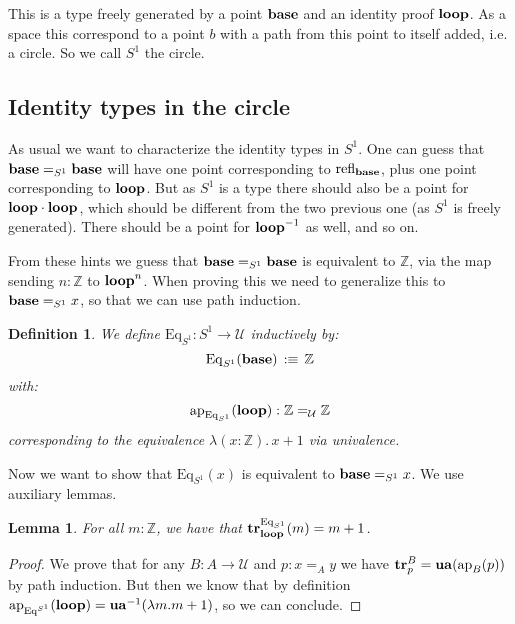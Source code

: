 \documentclass{article}
\newcommand{\sse}[1]{\medbreak \subsection{#1}}
\newcommand{\U}{{\mathcal U}}
\renewcommand{\r}{\rightarrow}
\newcommand{\Gl}{\lambda}
\newcommand{\ap}{\mathrm{ap}}
\newcommand{\refl}{\mathrm{refl}}
\newcommand{\tr}{\mathrm{\bf tr}}
\newcommand{\ua}{\mathrm{\bf ua}}
\newcommand{\base}{\mathrm{\bf base}}
\renewcommand{\loop}{\mathrm{\bf loop}}
\newcommand{\Eq}{\mathrm{Eq}}
\newtheorem{lemma}{Lemma}
\newtheorem{definition}{Definition}
\begin{document}
This is a type freely generated by a point $\base$ and an identity proof $\loop$. As a space this correspond to a point $b$ with a path from this point to itself added, i.e. a circle. So we call $S^1$ the circle. 

\sse{Identity types in the circle}

As usual we want to characterize the identity types in $S^1$. One can guess that $\base=_{S^1}\base$ will have one point corresponding to $\refl_\base$, plus one point corresponding to $\loop$. But as $S^1$ is a type there should also be a point for $\loop\cdot\loop$, which should be different from the two previous one (as $S^1$ is freely generated). There should be a point for $\loop^{-1}$ as well, and so on.

From these hints we guess that $\base=_{S^1}\base$ is equivalent to $\mathbb{Z}$, via the map sending $n:\mathbb{Z}$ to $\loop^n$. When proving this we need to generalize this to $\base=_{S^1}x$, so that we can use path induction.

\begin{definition}
We define $\Eq_{S^1} : S^1 \r \U$ inductively by:
\[\Eq_{S^1}(\base) \, :\equiv\, \mathbb{Z}\]
with: 
\[\ap_{\Eq_{S^1}}(\loop) : \mathbb{Z}=_\U\mathbb{Z}\] 
corresponding to the equivalence $\Gl(x:\mathbb{Z}).\, x+1$ via univalence.
\end{definition} 

Now we want to show that $\Eq_{S^1}(x)$ is equivalent to $\base=_{S^1}x$. We use auxiliary lemmas.


\begin{lemma}
For all $m:\mathbb{Z}$, we have that $\tr_\loop^{\Eq_{S^1}}(m) = m+1$.
\end{lemma}
\begin{proof}
We prove that for any $B:A\r \U$ and $p:x=_Ay$ we have $\tr^B_p = \ua(\ap_B(p))$ by path induction. But then we know that by definition $\ap_{\Eq^{S^1}}(\loop) = \ua^{-1}(\Gl m.m+1)$, so we can conclude.
\end{proof}
\end{document}
